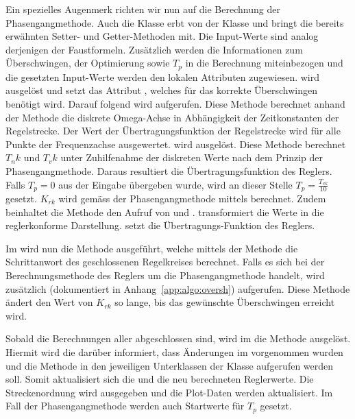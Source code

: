 Ein   spezielles  Augenmerk   richten   wir  nun   auf   die  Berechnung   der
Phasengangmethode. Auch  die   Klasse     erbt  von
der  Klasse    und  bringt die  bereits  erw\"ahnten  Setter-
und   Getter-Methoden  mit. Die   Input-Werte  sind   analog  derjenigen   der
Faustformeln. Zus\"atzlich  werden  die   Informationen  zum  \"Uberschwingen,
der   Optimierung   sowie   $T_p$   in  die   Berechnung   miteinbezogen   und
die   gesetzten  Input-Werte   werden  den   lokalen  Attributen   zugewiesen.
   wird   ausgel\"ost   und  setzt   das   Attribut
,   welches   f\"ur   das   korrekte   \"Uberschwingen   ben\"otigt
wird. Darauf   folgend  wird     aufgerufen. Diese   Methode
berechnet   anhand   der   Methode      die   diskrete
Omega-Achse  in  Abh\"angigkeit  der  Zeitkonstanten  der  Regelstrecke.   Der
Wert  der  \"Ubertragungsfunktion  der  Regelstrecke wird  f\"ur  alle  Punkte
der Frequenzachse  ausgewertet.   wird ausgel\"ost. Diese
Methode  berechnet   $T_nk$  und  $T_vk$  unter   Zuhilfenahme  der  diskreten
Werte   nach  dem   Prinzip  der   Phasengangmethode. Daraus  resultiert   die
\"Ubertragungsfunktion  des   Reglers. Falls  $T_p   =  0$  aus   der  Eingabe
\"ubergeben   wurde,  wird   an  dieser   Stelle  $T_p   =  \frac{T_{vk}}{10}$
gesetzt. $K_{rk}$    wird     gem\"ass    der     Phasengangmethode    mittels
     berechnet. Zudem      beinhaltet     die     Methode
   den    Aufruf   von   
und   .     transformiert   die
Werte   in  die   reglerkonforme   Darstellung.     setzt   die
\"Ubertragungs-Funktion des Reglers.

Im        wird    nun    die    Methode    
ausgef\"uhrt,  welche   mittels  der   Methode  
die   Schrittanwort  des   geschlossenen   Regelkreises  berechnet. Falls   es
sich  bei  der  Berechnungsmethode   des  Reglers  um  die  Phasengangmethode
handelt,  wird  zus\"atzlich   (dokumentiert  in
Anhang~\ref{app:algo:oversh}) aufgerufen. Diese Methode  \"andert den Wert von
$K_{rk}$ so lange, bis das gew\"unschte \"Uberschwingen erreicht wird.

Sobald die  Berechnungen aller  abgeschlossen  sind, wird im
  die  Methode   ausgel\"ost. Hiermit  wird
die    dar\"uber  informiert,  dass  \"Anderungen  im  
vorgenommen  wurden   und  die  Methode     in  den  jeweiligen
Unterklassen der Klasse  aufgerufen werden soll. Somit aktualisiert
sich die  und  die neu berechneten Reglerwerte. Die Streckenordnung
wird  ausgegeben   und  die   Plot-Daten  werden  aktualisiert. Im   Fall  der
Phasengangmethode werden auch Startwerte f\"ur $T_p$ gesetzt.

